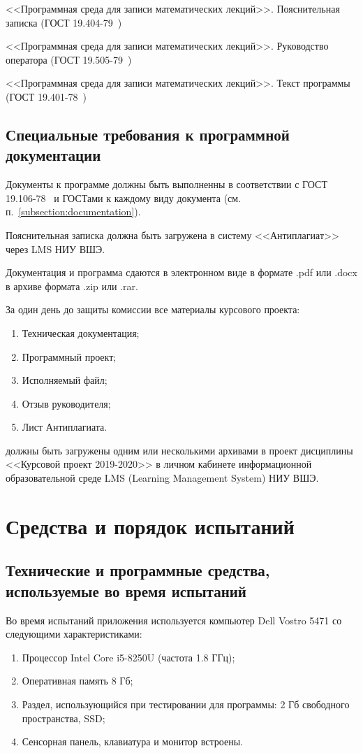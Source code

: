 \documentclass[testmethods]{espd}
\begin{document}
<<Программная среда для записи математических лекций>>. Пояснительная записка (ГОСТ 19.404-79~\cite{espd404})

<<Программная среда для записи математических лекций>>. Руководство оператора (ГОСТ 19.505-79~\cite{espd505})

<<Программная среда для записи математических лекций>>. Текст программы (ГОСТ 19.401-78~\cite{espd401})

\subsection{Специальные требования к программной документации}
Документы к программе должны быть выполненны в соответствии с ГОСТ 19.106-78~\cite{espd106} и ГОСТами к каждому виду документа (см. п.~\ref{subsection:documentation}).

Пояснительная записка должна быть загружена в систему <<Антиплагиат>> через LMS НИУ ВШЭ.

Документация и программа сдаются в электронном виде в формате .pdf или .docx в архиве формата .zip или .rar.

За один день до защиты комиссии все материалы курсового проекта:
\begin{enumerate}
\item Техническая документация;
\item Программный проект;
\item Исполняемый файл;
\item Отзыв руководителя;
\item Лист Антиплагиата.
\end{enumerate}
должны быть загружены одним или несколькими архивами в проект дисциплины <<Курсовой проект 2019-2020>> в личном кабинете информационной образовательной среде LMS (Learning Management System) НИУ ВШЭ.

\section{Средства и порядок испытаний}
\subsection{Технические и программные средства, используемые во время испытаний}
Во время испытаний приложения используется компьютер Dell Vostro 5471 со следующими характеристиками:

\begin{enumerate}
\item Процессор Intel Core i5-8250U (частота 1.8 ГГц);
\item Оперативная память 8 Гб;
\item Раздел, использующийся при тестировании для программы: 2 Гб свободного пространства, SSD;
\item Сенсорная панель, клавиатура и монитор встроены.
\end{enumerate}
\end{document}
